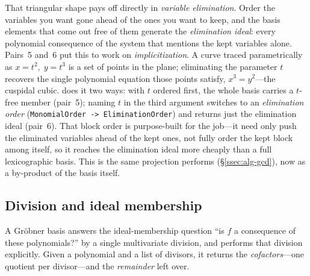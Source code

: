 That triangular shape pays off directly in \emph{variable
elimination}. Order the variables you want gone
ahead of the ones you want to keep, and the basis elements that come out free of them
generate the \emph{elimination ideal}: every polynomial
consequence of the system that mentions the kept variables alone. Pairs~5 and~6 put this
to work on \emph{implicitization}. A curve traced parametrically
as $x=t^2,\;y=t^3$ is a set of points in the plane; eliminating the parameter $t$
recovers the single polynomial equation those points satisfy, $x^3=y^2$---the cuspidal
cubic.  does it two ways: with $t$ ordered first, the whole basis
carries a $t$-free member (pair~5); naming $t$ in the third argument switches to an
\emph{elimination order}
(\texttt{MonomialOrder -> EliminationOrder}) and returns just the elimination ideal
(pair~6). That block order is purpose-built for the job---it need only push the
eliminated variables ahead of the kept ones, not fully order the kept block among
itself, so it reaches the elimination ideal more cheaply than a full lexicographic basis.
This is the same projection 
performs (\S\ref{ssec:alg-gcd}), now as a by-product of the basis
itself.

\subsection{Division and ideal membership}
\label{ssec:alg-polyreduce}

A Gr\"obner basis answers the ideal-membership question ``is $f$ a consequence of
these polynomials?'' by a single multivariate division, and 
performs that division explicitly. Given a polynomial and a list of divisors, it
returns the \emph{cofactors}---one quotient per divisor---and the \emph{remainder}
left over.

